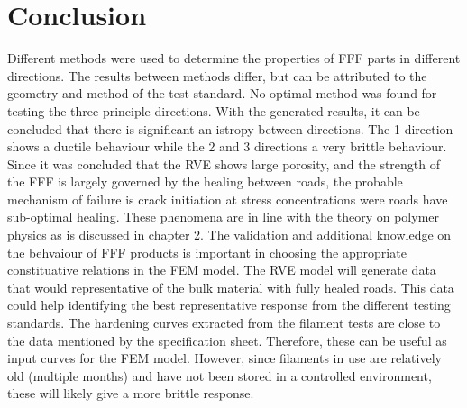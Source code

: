 \section{Conclusion}
Different methods were used to determine the properties of FFF parts in different directions. The results between methods differ, but can be attributed to the geometry and method of the test standard. No optimal method was found for testing the three principle directions. With the generated results, it can be concluded that there is significant an-istropy  between directions. The 1 direction shows a ductile behaviour while the 2 and 3 directions a very brittle behaviour. Since it was concluded that the RVE shows large porosity, and the strength of the FFF is largely governed by the healing  between roads, the probable mechanism of failure is crack initiation at stress concentrations were roads have sub-optimal healing. These phenomena are in line with the theory on polymer physics as is discussed in chapter 2. The validation and additional knowledge on the behvaiour of FFF products is important in choosing the appropriate constituative relations in the FEM model.  
The RVE model will generate data that would representative of the bulk material with fully healed roads. This data could help identifying the best representative response from the different testing standards.
The hardening curves extracted from the filament tests are close to the data mentioned by the specification sheet. Therefore, these can be useful as input curves for the FEM model. However, since filaments in use are relatively old (multiple months) and have not been stored in a controlled environment, these will likely give a more brittle response. 


